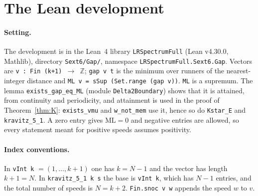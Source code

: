 \documentclass[11pt]{article}
\theoremstyle{definition}
\theoremstyle{remark}
\newcommand{\ML}{\mathrm{ML}}
\newcommand{\ZZ}{\mathbb{Z}}
\begin{document}
\section{The Lean development}\label{sec:lean}

\paragraph{Setting.}
The development is in the Lean~4 library \texttt{LRSpectrumFull} (Lean v4.30.0, Mathlib), directory \texttt{Sext6/Gap/}, namespace \texttt{LRSpectrumFull.Sext6.Gap}. Vectors are \texttt{v : Fin (k+1) $\to$ $\ZZ$}; \texttt{gap v t} is the minimum over runners of the nearest-integer distance and \texttt{ML v = sSup (Set.range (gap v))}. \texttt{ML} is a supremum. The lemma \texttt{exists\_gap\_eq\_ML} (module \texttt{Delta2Boundary}) shows that it is attained, from continuity and periodicity, and attainment is used in the proof of Theorem~\ref{thm:K}: \texttt{exists\_vmu} and \texttt{w\_not\_mem} use it, hence so do \texttt{Kstar\_E} and \texttt{kravitz\_5\_1}. A zero entry gives $\ML=0$ and negative entries are allowed, so every statement meant for positive speeds assumes positivity.

\paragraph{Index conventions.}
In \texttt{vInt k} $=(1,\dots,k+1)$ one has $k=N-1$ and the vector has length $k+1=N$. In \texttt{kravitz\_5\_1 k s} the base is \texttt{vInt k}, which has $N-1$ entries, and the total number of speeds is $N=k+2$. \texttt{Fin.snoc v w} appends the speed $w$ to $v$.
\end{document}
